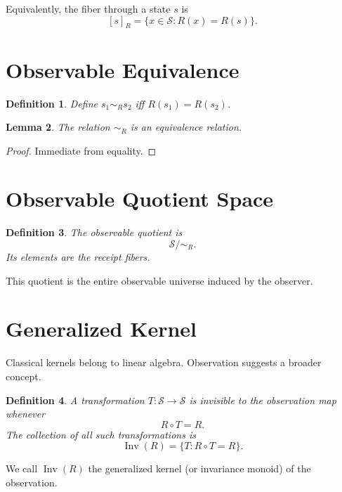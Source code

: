 \documentclass[11pt]{amsart}
\newtheorem{definition}{Definition}[section]
\newtheorem{lemma}[definition]{Lemma}
\begin{document}
Equivalently, the fiber through a state $s$ is
\[
[s]_R
=
\{ x \in \mathcal{S} : R(x) = R(s) \}.
\]

\section{Observable Equivalence}

\begin{definition}
Define $s_1 \sim_R s_2$ iff $R(s_1) = R(s_2)$.
\end{definition}

\begin{lemma}
The relation $\sim_R$ is an equivalence relation.
\end{lemma}

\begin{proof}
Immediate from equality.
\end{proof}

\section{Observable Quotient Space}

\begin{definition}
The observable quotient is
\[
\mathcal{S} / {\sim_R}.
\]
Its elements are the receipt fibers.
\end{definition}

This quotient is the entire observable universe induced by the observer.

\section{Generalized Kernel}

Classical kernels belong to linear algebra.
Observation suggests a broader concept.

\begin{definition}
A transformation $T: \mathcal{S} \rightarrow \mathcal{S}$ is invisible to
the observation map whenever
\[
R \circ T = R.
\]
The collection of all such transformations is
\[
\operatorname{Inv}(R)
=
\{ T : R \circ T = R \}.
\]
\end{definition}

We call $\operatorname{Inv}(R)$ the generalized kernel (or invariance monoid)
of the observation.
\end{document}
